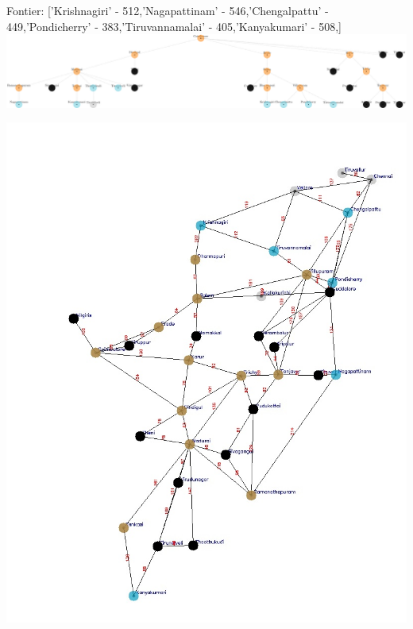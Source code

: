 \documentclass[xcolor=table]{beamer}
\begin{document}
\begin{frame}
  { \tiny Fontier: ['Krishnagiri' - 512,'Nagapattinam' - 546,'Chengalpattu' - 449,'Pondicherry' - 383,'Tiruvannamalai' - 405,'Kanyakumari' - 508,] }
  \includegraphics[width=1\textwidth]{../UCSNodes/37-1.png}
  \begin{center}
    \includegraphics[height=0.6\textheight]{../UCSoutput/tamilUCS38.jpg}
  \end{center}
\end{frame}
\end{document}
